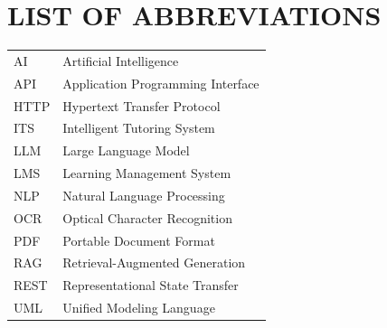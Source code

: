 \chapter*{LIST OF ABBREVIATIONS}
\vspace{-1.5em}

\renewcommand{\arraystretch}{1.6}
\begin{tabularx}{\textwidth}{p{3cm} X}
        AI   & Artificial Intelligence\\
        API  & Application Programming Interface\\
        HTTP & Hypertext Transfer Protocol\\
        ITS  & Intelligent Tutoring System\\
        LLM  & Large Language Model\\
        LMS  & Learning Management System\\
        NLP  & Natural Language Processing\\
        OCR  & Optical Character Recognition\\
        PDF & Portable Document Format\\
        RAG  & Retrieval-Augmented Generation\\
        REST & Representational State Transfer\\
        UML & Unified Modeling Language\\
\end{tabularx}
